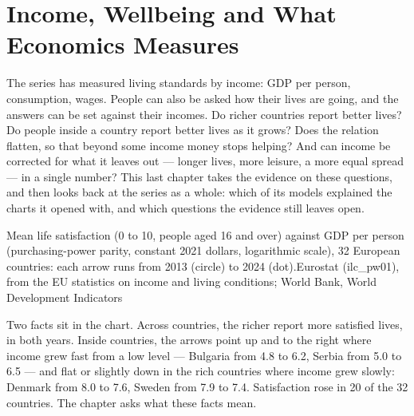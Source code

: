 \chapter{Income, Wellbeing and What Economics Measures}\label{ch:b3:income-and-wellbeing-evidence}

The series has measured living standards by income: GDP per person, consumption,
wages. People can also be asked how their lives are going, and the answers can be
set against their incomes. Do richer countries report better lives? Do people
inside a country report better lives as it grows? Does the relation flatten, so
that beyond some income money stops helping? And can income be corrected for what
it leaves out --- longer lives, more leisure, a more equal spread --- in a single
number? This last chapter takes the evidence on these questions, and then looks back
at the series as a whole: which of its models explained the charts it opened with,
and which questions the evidence still leaves open.

\begin{openingchart}{Mean life satisfaction (0 to 10, people aged 16 and over) against GDP per person
(purchasing-power parity, constant 2021 dollars, logarithmic scale), 32 European countries: each
arrow runs from 2013 (circle) to 2024 (dot).}{Eurostat (ilc\_pw01), from the EU statistics on
income and living conditions; World Bank, World Development Indicators}
\end{openingchart}

Two facts sit in the chart. Across countries, the richer report more satisfied
lives, in both years. Inside countries, the arrows point up and to the right where
income grew fast from a low level --- Bulgaria from 4.8 to 6.2, Serbia from 5.0 to 6.5 --- and flat or slightly down in
the rich countries where income grew slowly: Denmark from 8.0 to 7.6, Sweden from 7.9 to 7.4. Satisfaction rose in 20 of
the 32 countries. The chapter asks what these facts mean.


